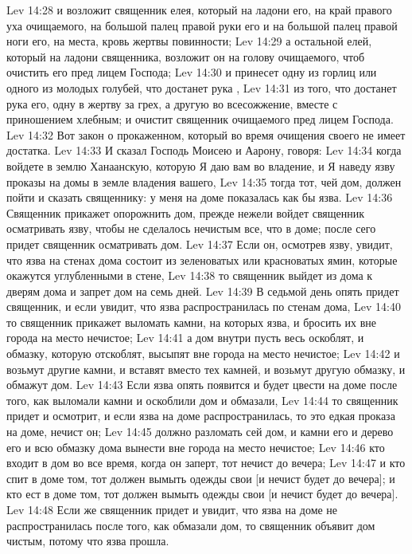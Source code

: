 \vs Lev 14:28 и возложит священник елея, который на ладони его, на край правого уха очищаемого, на большой палец правой руки его и на большой палец правой ноги его, на места,  кровь жертвы повинности;
\vs Lev 14:29 а остальной елей, который на ладони священника, возложит он на голову очищаемого, чтоб очистить его пред лицем Господа;
\vs Lev 14:30 и принесет одну из горлиц или одного из молодых голубей, что достанет рука ,
\vs Lev 14:31 из того, что достанет рука его, одну  в жертву за грех, а другую во всесожжение, вместе с приношением хлебным; и очистит священник очищаемого пред лицем Господа.
\vs Lev 14:32 Вот закон о прокаженном, который во время очищения своего не имеет достатка.
\rsbpar\vs Lev 14:33 И сказал Господь Моисею и Аарону, говоря:
\vs Lev 14:34 когда войдете в землю Ханаанскую, которую Я даю вам во владение, и Я наведу язву проказы на домы в земле владения вашего,
\vs Lev 14:35 тогда тот, чей дом, должен пойти и сказать священнику: у меня на доме показалась как бы язва.
\vs Lev 14:36 Священник прикажет опорожнить дом, прежде нежели войдет священник осматривать язву, чтобы не сделалось нечистым все, что в доме; после сего придет священник осматривать дом.
\vs Lev 14:37 Если он, осмотрев язву, увидит, что язва на стенах дома состоит из зеленоватых или красноватых ямин, которые окажутся углубленными в стене,
\vs Lev 14:38 то священник выйдет из дома к дверям дома и запрет дом на семь дней.
\vs Lev 14:39 В седьмой день опять придет священник, и если увидит, что язва распространилась по стенам дома,
\vs Lev 14:40 то священник прикажет выломать камни, на которых язва, и бросить их вне города на место нечистое;
\vs Lev 14:41 а дом внутри пусть весь оскоблят, и обмазку, которую отскоблят, высыпят вне города на место нечистое;
\vs Lev 14:42 и возьмут другие камни, и вставят вместо тех камней, и возьмут другую обмазку, и обмажут дом.
\vs Lev 14:43 Если язва опять появится и будет цвести на доме после того, как выломали камни и оскоблили дом и обмазали,
\vs Lev 14:44 то священник придет и осмотрит, и если язва на доме распространилась, то это едкая проказа на доме, нечист он;
\vs Lev 14:45 должно разломать сей дом, и камни его и дерево его и всю обмазку дома вынести вне города на место нечистое;
\vs Lev 14:46 кто входит в дом во все время, когда он заперт, тот нечист до вечера;
\vs Lev 14:47 и кто спит в доме том, тот должен вымыть одежды свои [и нечист будет до вечера]; и кто ест в доме том, тот должен вымыть одежды свои [и нечист будет до вечера].
\vs Lev 14:48 Если же священник придет и увидит, что язва на доме не распространилась после того, как обмазали дом, то священник объявит дом чистым, потому что язва прошла.

